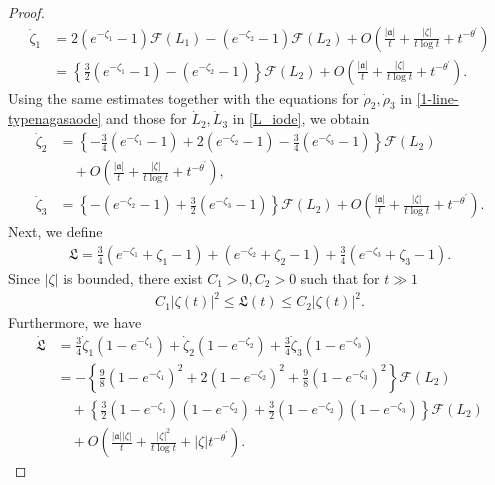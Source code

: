 \documentclass[reqno]{amsart}
\theoremstyle{plain}
\theoremstyle{definition}
\numberwithin{equation}{section}
\begin{document}
\begin{proof}
\begin{align*}
\dot{\zeta}_1&=2\left(e^{-\zeta_1}-1\right)\mathcal{F}(L_1)-\left(e^{-\zeta_2}-1\right)\mathcal{F}(L_2)+O\left(\frac{|\mathfrak{a}|}{t}+\frac{|\zeta|}{t\log{t}}+t^{-\theta^{\prime}}\right)
\\
&=\left\{ \frac{3}{2}\left(e^{-\zeta_1}-1\right)-\left(e^{-\zeta_2}-1\right)\right\}\mathcal{F}(L_2)+O\left(\frac{|\mathfrak{a}|}{t}+\frac{|\zeta|}{t\log{t}}+t^{-\theta^{\prime}}\right).
\end{align*}
Using the same estimates together with the equations for $\dot{\rho}_2,\dot{\rho}_3$ in
\eqref{1-line-typenagasaode} and those for $\dot{L}_2,\dot{L}_3$ in \eqref{L_iode}, we obtain
\begin{align*}
\dot{\zeta}_2&=\left\{-\frac{3}{4}\left(e^{-\zeta_1}-1\right)+2\left(e^{-\zeta_2}-1\right)-\frac{3}{4}\left(e^{-\zeta_3}-1\right)\right\}\mathcal{F}(L_2)
\\
&\quad+O\left(\frac{|\mathfrak{a}|}{t}+\frac{|\zeta|}{t\log{t}}+t^{-\theta^{\prime}}\right),
\\
\dot{\zeta}_3&=\left\{-\left(e^{-\zeta_2}-1\right)+\frac{3}{2}\left(e^{-\zeta_3}-1\right) \right\}\mathcal{F}(L_2)+O\left(\frac{|\mathfrak{a}|}{t}+\frac{|\zeta|}{t\log{t}}+t^{-\theta^{\prime}}\right).
\end{align*}
Next, we define
\begin{align*}
\mathfrak{L}=\frac{3}{4}\left(e^{-\zeta_1}+\zeta_1-1\right)+\left(e^{-\zeta_2}+\zeta_2-1\right)+\frac{3}{4}\left(e^{-\zeta_3}+\zeta_3-1\right).
\end{align*}
Since $|\zeta|$ is bounded, there exist $C_1>0, C_2>0$ such that for $t\gg 1$
\begin{align}\label{mathfraksim1}
C_1|\zeta(t)|^2\leq \mathfrak{L}(t)\leq C_2|\zeta(t)|^2.
\end{align}
Furthermore, we have
\begin{align*}
\dot{\mathfrak{L}}&=\frac{3}{4}\dot{\zeta}_1\left(1-e^{-\zeta_1}\right)+\dot{\zeta}_2\left(1-e^{-\zeta_2}\right)+\frac{3}{4}\dot{\zeta}_3\left(1-e^{-\zeta_3}\right)
\\
&=-\left\{ \frac{9}{8}\left(1-e^{-\zeta_1}\right)^2+2\left(1-e^{-\zeta_2}\right)^2+\frac{9}{8}\left(1-e^{-\zeta_3}\right)^2\right\}\mathcal{F}(L_2)
\\
&\quad+\left\{\frac{3}{2}\left(1-e^{-\zeta_1}\right)\left(1-e^{-\zeta_2}\right)+\frac{3}{2}\left(1-e^{-\zeta_2}\right)\left(1-e^{-\zeta_3}\right) \right\}\mathcal{F}(L_2)
\\
&\quad+O\left(\frac{|\mathfrak{a}||\zeta|}{t}+\frac{|\zeta|^2}{t\log{t}}+|\zeta|t^{-\theta^{\prime}}\right).

\end{align*}
\end{proof}
\end{document}
